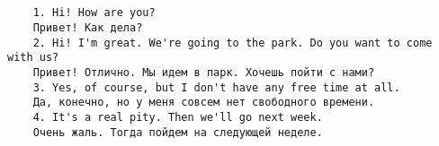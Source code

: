 \subsection*{}
\begin{verbatim}
    1. Hi! How are you?
    Привет! Как дела?
    2. Hi! I'm great. We're going to the park. Do you want to come with us?
    Привет! Отлично. Мы идем в парк. Хочешь пойти с нами?
    3. Yes, of course, but I don't have any free time at all.
    Да, конечно, но у меня совсем нет свободного времени.
    4. It's a real pity. Then we'll go next week.
    Очень жаль. Тогда пойдем на следующей неделе.
\end{verbatim}